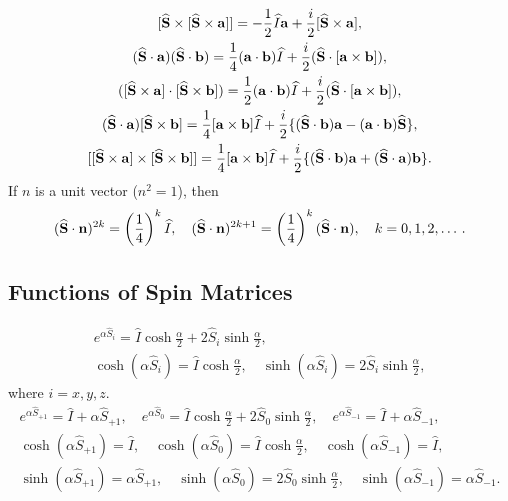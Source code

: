 \begin{gather}
{[\widehat{\mathbf{S}} \times[\widehat{\mathbf{S}} \times \mathbf{a}]]=-\frac{1}{2} \widehat{I} \mathbf{a}+\frac{i}{2}[\widehat{\mathbf{S}} \times \mathbf{a}],}  \label{eq:2:5:21}\\
(\widehat{\mathbf{S}} \cdot \mathbf{a})(\widehat{\mathbf{S}} \cdot \mathbf{b})=\frac{1}{4}(\mathbf{a} \cdot \mathbf{b}) \widehat{I}+\frac{i}{2}(\widehat{\mathbf{S}} \cdot[\mathbf{a} \times \mathbf{b}]),  \label{eq:2:5:22}\\
([\widehat{\mathbf{S}} \times \mathbf{a}] \cdot[\widehat{\mathbf{S}} \times \mathbf{b}])=\frac{1}{2}(\mathbf{a} \cdot \mathbf{b}) \widehat{I}+\frac{i}{2}(\widehat{\mathbf{S}} \cdot[\mathbf{a} \times \mathbf{b}]),  \label{eq:2:5:23}\\
(\widehat{\mathbf{S}} \cdot \mathbf{a})[\widehat{\mathbf{S}} \times \mathbf{b}]=\frac{1}{4}[\mathbf{a} \times \mathbf{b}] \widehat{I}+\frac{i}{2}\{(\widehat{\mathbf{S}} \cdot \mathbf{b}) \mathbf{a}-(\mathbf{a} \cdot \mathbf{b}) \widehat{\mathbf{S}}\},  \label{eq:2:5:24}\\
{[[\widehat{\mathbf{S}} \times \mathbf{a}] \times[\widehat{\mathbf{S}} \times \mathbf{b}]]=\frac{1}{4}[\mathbf{a} \times \mathbf{b}] \widehat{I}+\frac{i}{2}\{(\widehat{\mathbf{S}} \cdot \mathbf{b}) \mathbf{a}+(\widehat{\mathbf{S}} \cdot \mathbf{a}) \mathbf{b}\} .} \label{eq:2:5:25}
\end{gather}
If $n$ is a unit vector ($n^{2}=1$), then
\begin{equation}
(\widehat{\mathbf{S}} \cdot \mathbf{n})^{2 k}=\left(\frac{1}{4}\right)^{k} \widehat{I}, \quad(\widehat{\mathbf{S}} \cdot \mathbf{n})^{2 k+1}=\left(\frac{1}{4}\right)^{k}(\widehat{\mathbf{S}} \cdot \mathbf{n}), \quad k=0,1,2, \ldots \,.\label{eq:2:5:26}
\end{equation}
\subsection{Functions of Spin Matrices}
\begin{gather}
e^{\alpha \widehat{S}_{i}}=\widehat{I} \cosh \frac{\alpha}{2}+2 \widehat{S}_{i} \sinh \frac{\alpha}{2} , \label{eq:2:5:27}\\
\cosh \left(\alpha \widehat{S}_{i}\right)=\widehat{I} \cosh \frac{\alpha}{2}, \quad \sinh \left(\alpha \hat{S}_{i}\right)=2 \widehat{S}_{i} \sinh \frac{\alpha}{2}, \label{eq:2:5:28}
\end{gather}
where $i=x, y, z$.
\begin{gather}
e^{\alpha \widehat{S}_{+1}}=\widehat{I}+\alpha \widehat{S}_{+1}, \quad e^{\alpha \widehat{S}_{0}}=\hat{I} \cosh \frac{\alpha}{2}+2 \widehat{S}_{0} \sinh \frac{\alpha}{2}, \quad e^{\alpha \widehat{S}_{-1}}=\widehat{I}+\alpha \widehat{S}_{-1}  ,\label{eq:2:5:29}\\
\cosh \left(\alpha \widehat{S}_{+1}\right)=\widehat{I}, \quad \cosh \left(\alpha \widehat{S}_{0}\right)=\widehat{I} \cosh \frac{\alpha}{2}, \quad \cosh \left(\alpha \widehat{S}_{-1}\right)=\widehat{I} , \label{eq:2:5:30}\\
\sinh \left(\alpha \widehat{S}_{+1}\right)=\alpha \widehat{S}_{+1}, \quad \sinh \left(\alpha \widehat{S}_{0}\right)=2 \widehat{S}_{0} \sinh \frac{\alpha}{2}, \quad \sinh \left(\alpha \widehat{S}_{-1}\right)=\alpha \widehat{S}_{-1} .\label{eq:2:5:31}
\end{gather}
